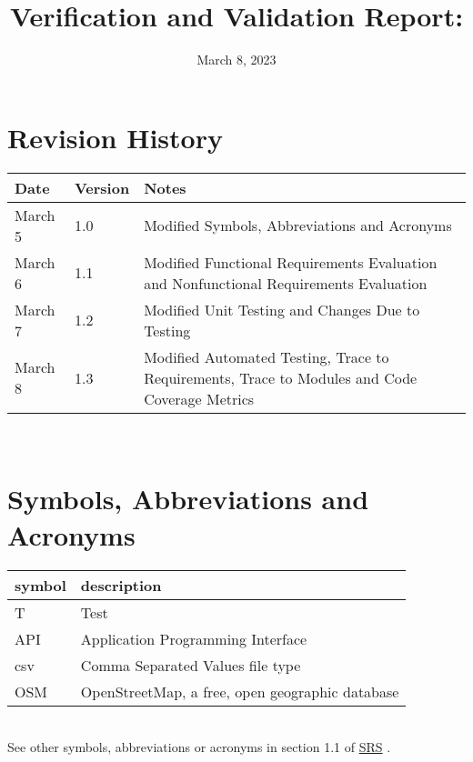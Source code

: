 \documentclass[12pt, titlepage]{article}
\begin{document}
\title{Verification and Validation Report: \progname} 
\author{\authname}
\date{March 8, 2023}
	
\maketitle


\section{Revision History}

\begin{tabularx}{\textwidth}{p{3cm}p{2cm}X}
\toprule {\bf Date} & {\bf Version} & {\bf Notes}\\
\midrule
March 5 & 1.0 & Modified Symbols, Abbreviations and Acronyms\\
March 6 & 1.1 & Modified Functional Requirements Evaluation and Nonfunctional Requirements Evaluation\\
March 7 & 1.2 & Modified Unit Testing and Changes Due to Testing\\
March 8 & 1.3 & Modified Automated Testing, Trace to Requirements, Trace to Modules and Code Coverage Metrics\\
\bottomrule
\end{tabularx}

~\newpage

\section{Symbols, Abbreviations and Acronyms}

\renewcommand{\arraystretch}{1.2}
\begin{tabular}{l l} 
  \toprule		
  \textbf{symbol} & \textbf{description}\\
  \midrule 
  T & Test\\
  API & Application Programming Interface\\
  csv & Comma Separated Values file type\\
  OSM & OpenStreetMap, a free, open geographic database\\
  \bottomrule
\end{tabular}\\

See other symbols, abbreviations or acronyms in section 1.1 of \href{https://github.com/paezha/PyERT-BLACK/blob/main/docs/SRS/SRS.pdf}{SRS} \citep{SRS}.
\end{document}
